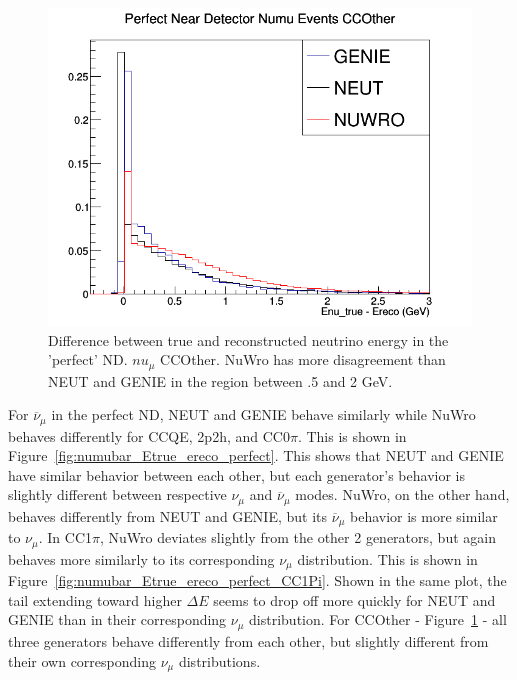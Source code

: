 \documentclass[12pt]{article}
\begin{document}
\begin{figure}[h]
\centering
{}
\includegraphics[width=\linewidth]{Ereco_Etrue/numu_perfect_ND_CCOther.png}
\endminipage
\caption{Difference between true and reconstructed neutrino energy in the 'perfect' ND. $nu_\mu$ CCOther. NuWro has more disagreement than NEUT and GENIE in the region between .5 and 2 GeV. }
\label{fig:numu_Etrue_ereco_perfect_CCOther}
\end{figure}
\FloatBarrier

For $\overline{\nu}_\mu$ in the perfect ND, NEUT and GENIE behave similarly while NuWro behaves differently for CCQE, 2p2h, and CC0$\pi$. This is shown in Figure~\ref{fig:numubar_Etrue_ereco_perfect}. This shows that NEUT and GENIE have similar behavior between each other, but each generator's behavior is slightly different between respective $\nu_\mu$ and $\overline{\nu}_\mu$ modes. NuWro, on the other hand, behaves differently from NEUT and GENIE, but its $\overline{\nu}_\mu$ behavior is more similar to $\nu_\mu$. In CC1$\pi$, NuWro deviates slightly from the other 2 generators, but again behaves more similarly to its corresponding $\nu_\mu$ distribution. This is shown in Figure~\ref{fig:numubar_Etrue_ereco_perfect_CC1Pi}. Shown in the same plot, the tail extending toward higher $\Delta E$ seems to drop off more quickly for NEUT and GENIE than in their corresponding $\nu_\mu$ distribution. For CCOther -  Figure~\ref{fig:numu_Etrue_ereco_perfect_CCOther} - all three generators behave differently from each other, but slightly different from their own corresponding $\nu_\mu$ distributions.
\end{document}
